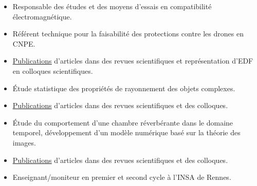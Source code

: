 \documentclass[9pt,a4paper,ragged2e,withhyper]{altacv}
\begin{document}
\begin{paracol}{2}
\divider

\begin{itemize}
\item Responsable des études et des moyens d'essais en compatibilité électromagnétique.
\item Référent technique pour la faisabilité des protections contre les drones en CNPE.
\item \underline{\href{https://scholar.google.fr/citations?user=r1s5JKYAAAAJ&hl=fr}{Publications}} d'articles dans des revues scientifiques et représentation d'EDF en colloques scientifiques.
\end{itemize}


\divider

\begin{itemize}
\item Étude statistique des propriétés de rayonnement des objets complexes.
\item \underline{\href{https://scholar.google.fr/citations?user=r1s5JKYAAAAJ&hl=fr}{Publications}} d'articles dans des revues scientifiques et des colloques.
\end{itemize}

\divider

\begin{itemize}
\item Étude du comportement d'une chambre réverbérante dans le domaine temporel, développement d'un modèle numérique basé sur la théorie des images.
\item \underline{\href{https://scholar.google.fr/citations?user=r1s5JKYAAAAJ&hl=fr}{Publications}} d'articles dans des revues scientifiques et des colloques.
\item Enseignant/moniteur en premier et second cycle à l'INSA de Rennes.
\end{itemize}
%
%
%

\smallskip


\end{paracol}
\end{document}
